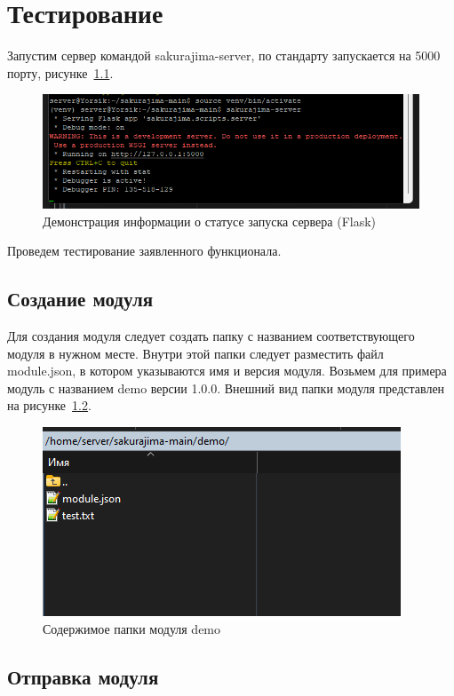 \chapter{  Тестирование}
\label{cha:research}

Запустим сервер командой sakurajima-server, по стандарту запускается на 5000 порту, рисунке~\ref{fig:test0}. 

\begin{figure}
  \centering
  \includegraphics[width=.9\textwidth]{graphics/test/dev_server_run.png}
  \caption{Демонстрация информации о статусе запуска сервера (Flask)}
  \label{fig:test0}
\end{figure}

Проведем тестирование заявленного функционала.

\section{Создание модуля}

Для создания модуля следует создать папку с названием соответствующего модуля в нужном месте. Внутри этой папки следует разместить файл module.json, в котором указываются имя и версия модуля. Возьмем для примера модуль с названием demo версии 1.0.0. Внешний вид папки модуля представлен на рисунке~\ref{fig:test1}.

\begin{figure}
  \centering
  \includegraphics[width=.6\textwidth]{graphics/test/demo_r.png}
  \caption{Содержимое папки модуля demo}
  \label{fig:test1}
\end{figure}
\newpage
\section{Отправка модуля}

